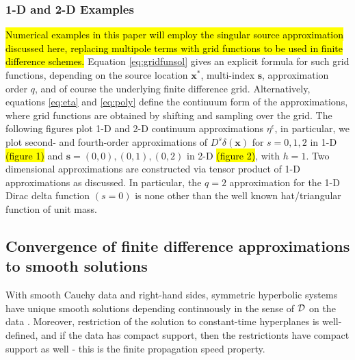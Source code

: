 \subsubsection{1-D and 2-D Examples}

\hl{Numerical examples in this paper will employ the singular source approximation discussed here, replacing multipole terms with grid functions to be used in finite difference schemes.}
Equation \ref{eq:gridfunsol} gives an explicit formula for such grid functions, depending on the source location $\mathbf x^*$, multi-index $\mathbf s$, approximation order $q$, and of course the underlying finite difference grid.
Alternatively, equations \ref{eq:eta} and \ref{eq:poly} define the continuum form of the approximations, where grid functions are obtained by shifting and sampling over the grid.
The following figures plot 1-D and 2-D continuum approximations $\eta^\epsilon$,
in particular, we plot second- and fourth-order approximations of 
$D^s\delta(\mathbf x)$ for $s=0,1,2$ in 1-D \hl{(figure 1)} and $\mathbf s=(0,0),(0,1),(0,2)$ in 2-D \hl{(figure 2)}, with $h=1$.
Two dimensional approximations are constructed via tensor product of 1-D approximations as discussed.
In particular, the $q=2$ approximation for the 1-D Dirac delta function $(s=0)$ is none other than the well known hat/triangular function of unit mass.


\subsection{Convergence of finite difference approximations to smooth solutions}


With smooth Cauchy data and
right-hand sides, symmetric hyperbolic systems have unique smooth solutions depending
continuously in the sense of ${\cal D}$ on the data
\cite[]{CourHil:62,Lax:PDENotes}. Moreover, restriction of the
solution to constant-time hyperplanes is well-defined, and if the data has compact
support, then the restrictionts have compact support as well - this is
the finite propagation speed property.

